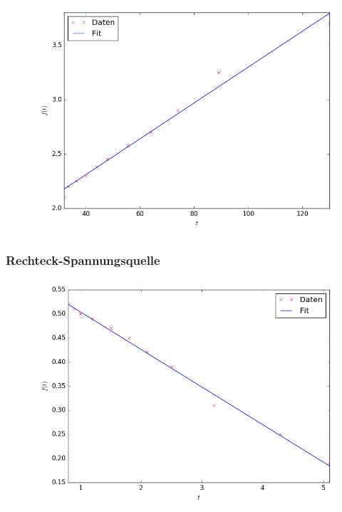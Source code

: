 \begin{figure}[H]
	\centering
	\caption{}
	\includegraphics[width=\linewidth-70pt,height=\textheight-70pt,keepaspectratio]{GleichstromR.png}
	\label{fig:GleichstromR}
\end{figure}


\newpage
\subsubsection{Rechteck-Spannungsquelle}

\begin{figure}[H]
	\centering
	\caption{}
	\includegraphics[width=\linewidth-70pt,height=\textheight-70pt,keepaspectratio]{Rechteck.png}
	\label{fig:Rechteck}
\end{figure}


